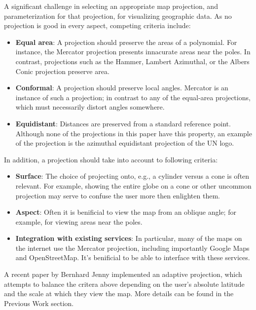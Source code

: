 A significant challenge in selecting an appropriate map projection, and
  parameterization for that projection, for visualizing geographic data.
As no projection is good in every aspect, competing criteria include:

\begin{itemize}
  \item \textbf{Equal area}: A projection should preserve the areas of a
        polynomial. For instance, the Mercator projection presents innacurate
        areas near the poles. In contrast, projections such as the Hammer,
        Lambert Azimuthal, or the Albers Conic projection preserve area.
  \item \textbf{Conformal}: A projection should preserve local angles.
        Mercator is an instance of such a projection; in contrast to any of the
        equal-area projections, which must necessarily distort angles somewhere.
  \item \textbf{Equidistant}:  Distances are preserved from a standard
        reference point. Although none of the projections in this paper have
        this property, an example of the projection is the azimuthal
        equidistant projection of the UN logo.
\end{itemize}

In addition, a projection should take into account to following criteria:

\begin{itemize}
  \item \textbf{Surface}: The choice of projecting onto, e.g., a cylinder versus
        a cone is often relevant. For example, showing the entire globe on a
        cone or other uncommon projection may serve to confuse the user more
        then enlighten them.
  \item \textbf{Aspect}: Often it is benificial to view the map from an oblique
        angle; for example, for viewing areas near the poles.
  \item \textbf{Integration with existing services}: In particular, many of the
        maps on the internet use the Mercator projection, including importantly
        Google Maps and OpenStreetMap. It's benificial to be able to interface
        with these services.
\end{itemize}

A recent paper by Bernhard Jenny \cite{key:2012jenny-maps} implemented an
  adaptive projection, which attempts to balance the critera above
  depending on the user's absolute latitude and the scale at which they
  view the map.
More details can be found in the Previous Work section.


